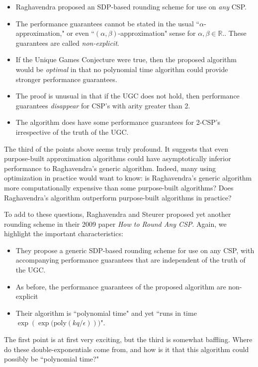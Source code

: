 \begin{itemize}
\item Raghavendra proposed an SDP-based rounding scheme for use on \textit{any} CSP.
\item The performance guarantees cannot be stated in the usual ``$\alpha$-approximation," or even ``$(\alpha,\beta)$-approximation" sense for $\alpha,\beta \in \mathbb{R}$..  These guarantees are called \textit{non-explicit}.
\item If the Unique Games Conjecture were true, then the proposed algorithm would be \textit{optimal} in that no polynomial time algorithm could provide stronger performance guarantees.
\item The proof is unusual in that if the UGC does not hold, then performance guarantees \textit{disappear} for CSP's with arity greater than 2.
\item The algorithm does have some performance guarantees for 2-CSP's irrespective of the truth of the UGC.
\end{itemize}

The third of the points above seems truly profound. It suggests that even purpose-built approximation algorithms could have asymptotically inferior performance to Raghavendra's generic algorithm. Indeed, many using optimization in practice would want to know: is Raghavendra's generic algorithm more computationally expensive than some purpose-built algorithms? Does Raghavendra's algorithm outperform purpose-built algorithms in practice? 

To add to these questions, Raghavendra and Steurer proposed yet another rounding scheme in their 2009 paper \textit{How to Round Any CSP}. Again, we highlight the important characteristics:

\begin{itemize}
\item They propose a generic SDP-based rounding scheme for use on any CSP, with accompanying performance guarantees that are independent of the truth of the UGC.
\item As before, the performance guarantees of the proposed algorithm are non-explicit
\item Their algorithm is ``polynomial time" and yet ``runs in time $\exp{(\exp{(\text{poly}(kq/\epsilon)}))}$".
\end{itemize}

The first point is at first very exciting, but the third is somewhat baffling. Where do these double-exponentials come from, and how is it that this algorithm could possibly be ``polynomial time?"

